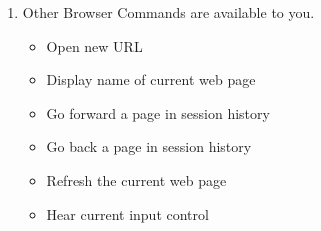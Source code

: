 \documentclass[10pt,letterpaper,twoside]{report}
\begin{document}
\begin{enumerate}
\begin{enumerate}
\begin{itemize}
		            \end{itemize}
		      \item Other Browser Commands are available to you.
		            \begin{itemize}
			            \item Open new URL 
			            \item Display name of current web page 
			            \item Go forward a page in session history 
			            \item Go back a page in session history 
			            \item Refresh the current web page 
			            \item Hear current input control 
		            \end{itemize}
	      \end{enumerate}
\end{enumerate}

\clearpage
\end{document}
